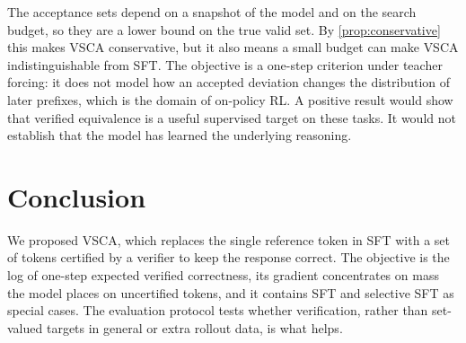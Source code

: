 \documentclass{article}
\newcommand{\vsca}{\textsc{VSCA}}
\theoremstyle{plain}
\theoremstyle{remark}
\begin{document}
The acceptance sets depend on a snapshot of the model and on the search budget, so they are a lower bound on the true valid set. By \cref{prop:conservative} this makes \vsca{} conservative, but it also means a small budget can make \vsca{} indistinguishable from SFT. The objective is a one-step criterion under teacher forcing: it does not model how an accepted deviation changes the distribution of later prefixes, which is the domain of on-policy RL. A positive result would show that verified equivalence is a useful supervised target on these tasks. It would not establish that the model has learned the underlying reasoning.

\section{Conclusion}
We proposed \vsca, which replaces the single reference token in SFT with a set of tokens certified by a verifier to keep the response correct. The objective is the log of one-step expected verified correctness, its gradient concentrates on mass the model places on uncertified tokens, and it contains SFT and selective SFT as special cases. The evaluation protocol tests whether verification, rather than set-valued targets in general or extra rollout data, is what helps.



\end{document}
